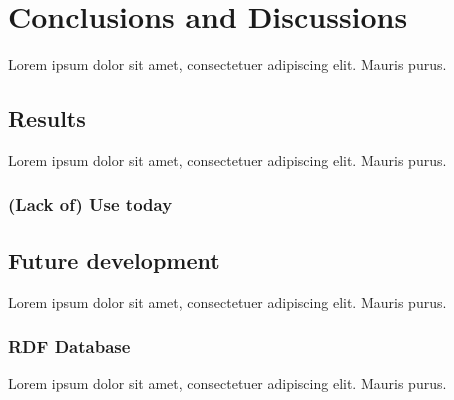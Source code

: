 \chapter{Conclusions and Discussions}

Lorem ipsum dolor sit amet, consectetuer adipiscing elit. Mauris
purus. 

\section{Results}

Lorem ipsum dolor sit amet, consectetuer adipiscing elit. Mauris
purus. 

\subsection{(Lack of) Use today}
\section{Future development}

Lorem ipsum dolor sit amet, consectetuer adipiscing elit. Mauris
purus. 

\subsection{RDF Database}

Lorem ipsum dolor sit amet, consectetuer adipiscing elit. Mauris
purus. 
